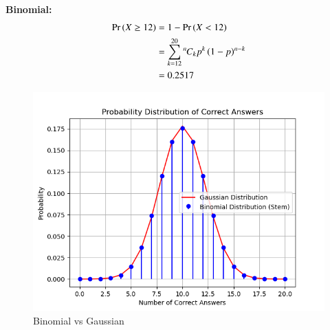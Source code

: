 \documentclass[journal,12pt,twocolumn]{IEEEtran}
\theoremstyle{remark}
\begin{document}
\textbf{Binomial:}
\begin{align}
\Pr\left(X\ge12\right) &= 1 - \Pr\left(X<12\right) \\
&= \sum_{k=12}^{20}{{}^{n}\mkern-1muC_{k}}p^k\left(1-p\right)^{n-k} \\
&= 0.2517
\end{align}
\begin{figure}[!ht]
\centering
\includegraphics[width=\columnwidth]{ncert/9/3/4/figs/dist.png}
\caption{Binomial vs Gaussian}
\label{fig:BvG_py}
\end{figure}
\end{document}
